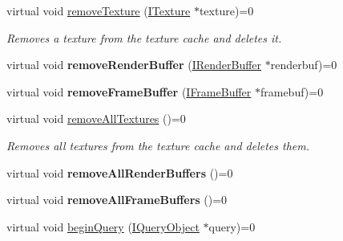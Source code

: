 \begin{DoxyCompactItemize}
\item 
virtual void \hyperlink{classirr_1_1video_1_1IVideoDriver_ac88319ec41daa23fef2ae935285afcc9}{remove\+Texture} (\hyperlink{classirr_1_1video_1_1ITexture}{I\+Texture} $\ast$texture)=0
\begin{DoxyCompactList}\small\item\em Removes a texture from the texture cache and deletes it. \end{DoxyCompactList}\item 
virtual void {\bfseries remove\+Render\+Buffer} (\hyperlink{classirr_1_1video_1_1IRenderBuffer}{I\+Render\+Buffer} $\ast$renderbuf)=0\hypertarget{classirr_1_1video_1_1IVideoDriver_a58817dcfb83529e627504b095edafbe4}{}\label{classirr_1_1video_1_1IVideoDriver_a58817dcfb83529e627504b095edafbe4}

\item 
virtual void {\bfseries remove\+Frame\+Buffer} (\hyperlink{classirr_1_1video_1_1IFrameBuffer}{I\+Frame\+Buffer} $\ast$framebuf)=0\hypertarget{classirr_1_1video_1_1IVideoDriver_a02616480a0d14d2b5b5e06727a58fdc1}{}\label{classirr_1_1video_1_1IVideoDriver_a02616480a0d14d2b5b5e06727a58fdc1}

\item 
virtual void \hyperlink{classirr_1_1video_1_1IVideoDriver_a179990e76fa91175d46c891b3508e717}{remove\+All\+Textures} ()=0
\begin{DoxyCompactList}\small\item\em Removes all textures from the texture cache and deletes them. \end{DoxyCompactList}\item 
virtual void {\bfseries remove\+All\+Render\+Buffers} ()=0\hypertarget{classirr_1_1video_1_1IVideoDriver_af81a6192421b73903c2bc3a422337e59}{}\label{classirr_1_1video_1_1IVideoDriver_af81a6192421b73903c2bc3a422337e59}

\item 
virtual void {\bfseries remove\+All\+Frame\+Buffers} ()=0\hypertarget{classirr_1_1video_1_1IVideoDriver_ad32e60d68c5121d1414539dc1648ae6a}{}\label{classirr_1_1video_1_1IVideoDriver_ad32e60d68c5121d1414539dc1648ae6a}

\item 
virtual void \hyperlink{classirr_1_1video_1_1IVideoDriver_abda0f0cef1461cb199270e367280861e}{begin\+Query} (\hyperlink{classirr_1_1video_1_1IQueryObject}{I\+Query\+Object} $\ast$query)=0\hypertarget{classirr_1_1video_1_1IVideoDriver_abda0f0cef1461cb199270e367280861e}{}\label{classirr_1_1video_1_1IVideoDriver_abda0f0cef1461cb199270e367280861e}


\end{DoxyCompactItemize}
